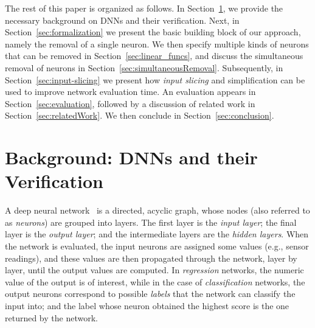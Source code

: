 \documentclass[10pt, conference, twocolumn, compsocconf]{IEEEtran}
\theoremstyle{remark}
\begin{document}
The rest of this paper is organized as follows. In
Section~\ref{sec:background}, we provide the necessary background on
DNNs and their verification. Next, in Section~\ref{sec:formalization}
we present the basic building block of our approach, namely the
removal of a single neuron. We then specify multiple kinds of neurons
that can be removed in Section~\ref{sec:linear_funcs}, and discuss the
simultaneous removal of neurons in
Section~\ref{sec:simultaneousRemoval}.  Subsequently, in
Section~\ref{sec:input-slicing} we present how \emph{input slicing}
and simplification can be used to improve network evaluation time.  An
evaluation appears in Section~\ref{sec:evaluation}, followed by a
discussion of related work in Section~\ref{sec:relatedWork}. We then
conclude in Section~\ref{sec:conclusion}.


\section{Background: DNNs and their Verification}
\label{sec:background}

A deep neural network~\cite{GoBeCo16} is a directed, acyclic graph,
whose nodes (also referred to as \emph{neurons}) are grouped into
layers. The first layer is the \emph{input layer}; the final layer is
the \emph{output layer}; and the intermediate layers are the
\emph{hidden layers}. When the network is evaluated, the input neurons
are assigned some values (e.g., sensor readings), and these values are
then propagated through the network, layer by layer, until the output
values are computed. In \emph{regression} networks, the numeric value
of the output is of interest, while in the case of
\emph{classification} networks, the output
neurons correspond to possible \emph{labels} that the network can
classify the input into; and the label whose neuron obtained the
highest score is the one returned by the network.
\end{document}
